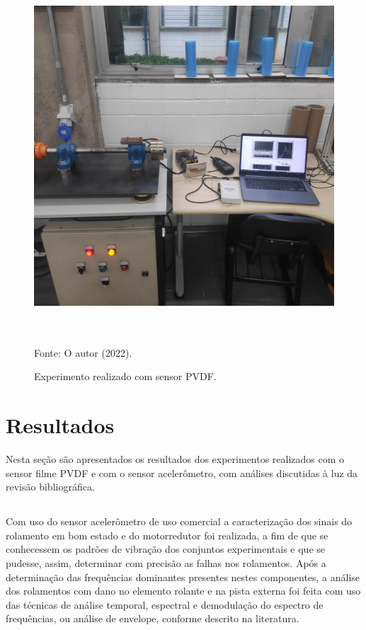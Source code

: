\documentclass[
	12pt,				
	oneside,			
	a4paper,			
	english,			
	brazil,	
	sumario=abnt-6027-2012		
	]{abntex2ppgsi}
\begin{document}
\begin{figure}[H]
\centering
\caption {Experimento realizado com sensor PVDF.}
\includegraphics[width=\textwidth,height=140mm,keepaspectratio]{setup_experimental_pvdf} \\
Fonte: O autor (2022).
\label{experimento_pvdf}
\end{figure}


\chapter{Resultados}

Nesta seção são apresentados os resultados dos experimentos realizados com o sensor filme PVDF e com o sensor acelerômetro, com análises discutidas à luz da revisão bibliográfica. 

\section{}

Com uso do sensor acelerômetro de uso comercial a caracterização dos sinais do rolamento em bom estado e do motorredutor foi realizada, a fim de que se conhecessem os padrões de vibração dos conjuntos experimentais e que se pudesse, assim, determinar com precisão as falhas nos rolamentos. Após a determinação das frequências dominantes presentes nestes componentes, a análise dos rolamentos com dano no elemento rolante e na pista externa foi feita com uso das técnicas de análise temporal, espectral e demodulação do espectro de frequências, ou análise de envelope, conforme descrito na literatura.
\end{document}
